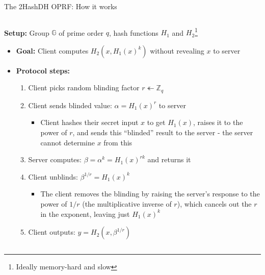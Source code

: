 \documentclass[aspectratio=169, lualatex, handout]{beamer}
\begin{document}
\begin{frame}{The 2HashDH OPRF: How it works}
	\begin{columns}[c]
		\begin{column}{1\textwidth}
			\textbf{Setup:} Group $\mathbb{G}$ of prime order $q$, hash functions $H_1$ and $H_2$\footnote{Ideally memory-hard and slow}
			\begin{itemize}
				\item \textbf{Goal:} Client computes $H_2(x, H_1(x)^k)$ without revealing $x$ to server
				\item \textbf{Protocol steps:}
				      \begin{enumerate}
					      \item Client picks random blinding factor $r \twoheadleftarrow \mathbb{Z}_q$
					      \item Client sends blinded value: $\alpha = H_1(x)^r$ to server
						            {\footnotesize\begin{itemize}
								            \item Client hashes their secret input $x$ to get $H_1(x)$, raises it to the power of $r$, and sends this ``blinded'' result to the server - the server cannot determine $x$ from this
							            \end{itemize}}
					      \item Server computes: $\beta = \alpha^k = H_1(x)^{rk}$ and returns it
					      \item Client unblinds: $\beta^{1/r} = H_1(x)^k$
					            {\footnotesize\begin{itemize}
								            \item The client removes the blinding by raising the server's response to the power of $1/r$ (the multiplicative inverse of $r$), which cancels out the $r$ in the exponent, leaving just $H_1(x)^k$
							            \end{itemize}}
					      \item Client outputs: $y = H_2(x, \beta^{1/r})$
				      \end{enumerate}
			\end{itemize}
		\end{column}
	\end{columns}
\end{frame}
\end{document}

